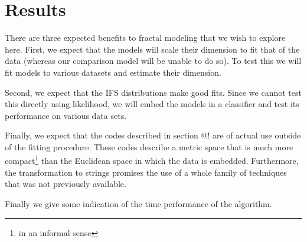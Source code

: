 \documentclass[10pt,a4paper,oneside]{article}
\theoremstyle{definition}
\begin{document}




\section*{Results}

There are three expected benefits to fractal modeling that we wish to explore here. First, we expect that the models will scale their dimension to fit that of the data (whereas our comparison model will be unable to do so). To test this we will fit models to various datasets and estimate their dimension. 

Second, we expect that the IFS distributions make good fits. Since we cannot test this directly using likelihood, we will embed the models in a classifier and test its performance on various data sets.

Finally, we expect that the codes described in section @! are of actual use outside of the fitting procedure. These codes describe a metric space that is much more compact\footnote{in an informal sense} than the Euclidean space in which the data is embedded. Furthermore, the transformation to strings promises the use of a whole family of techniques that was not previously available.

Finally we give some indication of the time performance of the algorithm.
\end{document}
